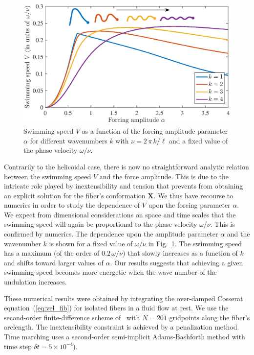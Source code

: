 \documentclass[aps,prl,preprint,groupedaddress]{revtex4-2}
\newcommand{\bX}{\bm X}
\begin{document}
\begin{figure}[ht]
  \centerline{\includegraphics[width=\columnwidth]{swimming_speed_nofluid}}
  \caption{\label{fig:swimming_speed_nofluid} Swimming speed $V$ as a function of the forcing amplitude parameter $\alpha$ for different wavenumbers $k$ with $\nu = 2\,\pi\,k/\ell$ and a fixed value of the phase velocity $\omega/\nu$.}
\end{figure}
Contrarily to the helicoidal case, there is now no straightforward analytic relation between the swimming speed $V$ and the force amplitude. This is due to the intricate role played by inextensibility and tension that prevents from obtaining an explicit solution for the fiber's conformation $\bX$. We thus have recourse to numerics in order to study the dependence of $V$ upon the forcing parameter $\alpha$. We expect from dimensional considerations on space and time scales that the swimming speed will again be proportional to the phase velocity $\omega/\nu$. This is confirmed by numerics. The dependence upon the amplitude parameter $\alpha$ and the wavenumber $k$ is shown for a fixed value of $\omega/\nu$ in Fig.~\ref{fig:swimming_speed_nofluid}. The swimming speed has a maximum (of the order of $0.2\,\omega/\nu$) that slowly increases as a function of $k$ and shifts toward larger values of $\alpha$. Our results suggests that achieving a given swimming speed becomes more energetic when the wave number of the undulation increases.

These numerical results were obtained by integrating the over-damped Cosserat equation~(\ref{eq:vel_fib}) for isolated fibers in a fluid flow at rest. We use the second-order finite-difference scheme of~\cite{tornberg2004simulating} with $N=201$ gridpoints along the fiber's arclength. The inextensibility constraint is achieved by a penalization method. Time marching uses a second-order semi-implicit Adams-Bashforth method with time step $\delta t = 5\times10^{-4}$).
\end{document}
